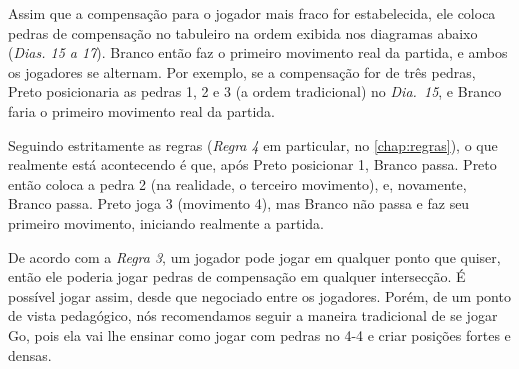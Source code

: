 Assim que a compensação para o jogador mais fraco for estabelecida, ele coloca pedras de compensação no tabuleiro na ordem exibida nos diagramas abaixo (\emph{Dias. 15 a 17}). Branco então faz o primeiro movimento real da partida, e ambos os jogadores se alternam. Por exemplo, se a compensação for de três pedras, Preto posicionaria as pedras 1, 2 e 3 (a ordem tradicional) no \emph{Dia.\@~15}, e Branco faria o primeiro movimento real da partida.

Seguindo estritamente as regras (\emph{Regra 4} em particular, no \autoref{chap:regras}), o que realmente está acontecendo é que, após Preto posicionar 1, Branco passa. Preto então coloca a pedra 2 (na realidade, o terceiro movimento), e, novamente, Branco passa. Preto joga 3 (movimento 4), mas Branco não passa e faz seu primeiro movimento, iniciando realmente a partida.

De acordo com a \emph{Regra 3}, um jogador pode jogar em qualquer ponto que quiser, então ele poderia jogar pedras de compensação em qualquer intersecção. É possível jogar assim, desde que negociado entre os jogadores. Porém, de um ponto de vista pedagógico, nós recomendamos seguir a maneira tradicional de se jogar Go, pois ela vai lhe ensinar como jogar com pedras no 4-4 e criar posições fortes e densas.
